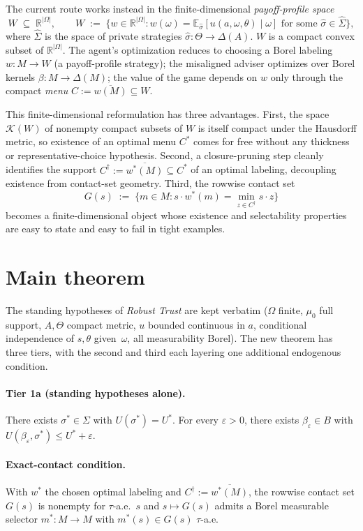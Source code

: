 \documentclass[11pt]{article}
\theoremstyle{definition}
\theoremstyle{remark}
\newcommand{\R}{\mathbb{R}}
\newcommand{\eps}{\varepsilon}
\newcommand{\Om}{\Omega}
\newcommand{\Th}{\Theta}
\newcommand{\Si}{\Sigma}
\newcommand{\E}{\mathbb{E}}
\begin{document}
The current route works instead in the finite-dimensional
\emph{payoff-profile space}
\[
  W \;\subseteq\; \R^{|\Om|},
  \qquad
  W \;:=\; \big\{w\in\R^{|\Om|} : w(\omega) = \E_{\hat\sigma}[u(a,\omega,\theta)\mid\omega]\text{ for some }\hat\sigma\in\hat\Si\big\},
\]
where $\hat\Si$ is the space of private strategies $\hat\sigma:\Th\to\Delta(A)$.
$W$ is a compact convex subset of $\R^{|\Om|}$. The agent's optimization
reduces to choosing a Borel labeling $w:M\to W$ (a payoff-profile
strategy); the misaligned adviser optimizes over Borel kernels
$\beta:M\to\Delta(M)$; the value of the game depends on $w$ only
through the compact \emph{menu} $C := \overline{w(M)}\subseteq W$.

This finite-dimensional reformulation has three advantages. First,
the space $\mathcal K(W)$ of nonempty compact subsets of $W$ is
itself compact under the Hausdorff metric, so existence of an
optimal menu $C^*$ comes for free without any thickness or
representative-choice hypothesis. Second, a closure-pruning step
cleanly identifies the support $C^\dagger := \overline{w^*(M)}\subseteq C^*$
of an optimal labeling, decoupling existence from contact-set
geometry. Third, the rowwise contact set
\[
  G(s) \;:=\; \{m\in M : s\cdot w^*(m) = \min_{z\in C^\dagger} s\cdot z\}
\]
becomes a finite-dimensional object whose existence and selectability
properties are easy to state and easy to fail in tight examples.

\section{Main theorem}\label{sec:main}

The standing hypotheses of \emph{Robust Trust} are kept verbatim
($\Om$ finite, $\mu_0$ full support, $A,\Th$ compact metric, $u$
bounded continuous in $a$, conditional independence of $s,\theta$
given~$\omega$, all measurability Borel). The new theorem has three
tiers, with the second and third each layering one additional
endogenous condition.

\paragraph{Tier 1a (standing hypotheses alone).}
There exists $\sigma^*\in\Si$ with $U(\sigma^*) = U^*$. For every
$\eps>0$, there exists $\beta_\eps\in B$ with
$U(\beta_\eps,\sigma^*) \le U^* + \eps$.

\paragraph{Exact-contact condition.}
With $w^*$ the chosen optimal labeling and $C^\dagger := \overline{w^*(M)}$,
the rowwise contact set $G(s)$ is nonempty for $\tau$-a.e.~$s$ and
$s\mapsto G(s)$ admits a Borel measurable selector
$m^*:M\to M$ with $m^*(s)\in G(s)$ $\tau$-a.e.
\end{document}
